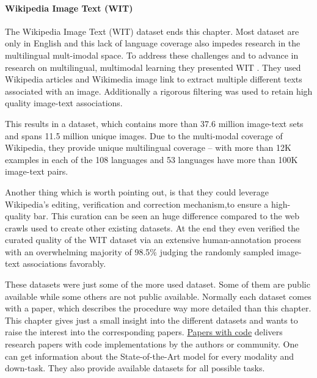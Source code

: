 \documentclass[
]{krantz}
\begin{document}
\hypertarget{wikipedia-image-text-wit}{%
\paragraph{Wikipedia Image Text (WIT)}\label{wikipedia-image-text-wit}}

The Wikipedia Image Text (WIT) dataset ends this chapter. Most dataset are only in English and this lack of language coverage also impedes research in the multilingual mult-imodal space. To address these challenges and to advance in research on multilingual, multimodal learning they presented WIT \citep{srinivasan2021wit}. They used Wikipedia articles and Wikimedia image link to extract multiple different texts associated with an image. Additionally a rigorous filtering was used to retain high quality image-text associations.

This results in a dataset, which contains more than 37.6 million image-text sets and spans 11.5 million unique images. Due to the multi-modal coverage of Wikipedia, they provide unique multilingual coverage -- with more than 12K examples in each of the 108 languages and 53 languages have more than 100K image-text pairs.

Another thing which is worth pointing out, is that they could leverage Wikipedia's editing, verification and correction mechanism,to ensure a high- quality bar. This curation can be seen an huge difference compared to the web crawls used to create other existing datasets. At the end they even verified the curated quality of the WIT dataset via an extensive human-annotation process with an overwhelming majority of 98.5\% judging the randomly sampled image-text associations favorably.

These datasets were just some of the more used dataset. Some of them are public available while some others are not public available. Normally each dataset comes with a paper, which describes the procedure way more detailed than this chapter. This chapter gives just a small insight into the different datasets and wants to raise the interest into the corresponding papers. \href{https://paperswithcode.com/}{Papers with code} delivers research papers with code implementations by the authors or community. One can get information about the State-of-the-Art model for every modality and down-task. They also provide available datasets for all possible tasks.
\end{document}
